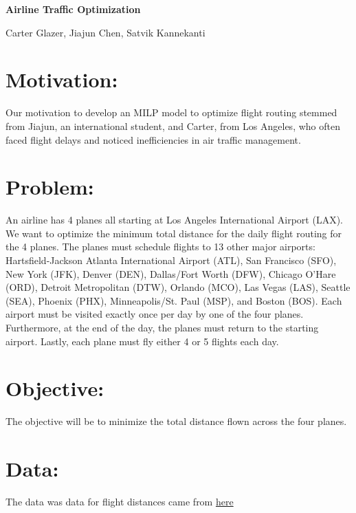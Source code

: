 \documentclass[12pt]{extarticle}
\begin{document}
\begin{center}
\textbf{Airline Traffic Optimization} \\
\begin{center}
Carter Glazer, Jiajun Chen, Satvik Kannekanti
\end{center}
\end{center}

\section*{\small Motivation:}
\hspace{1cm}
Our motivation to develop an MILP model to optimize flight routing stemmed from Jiajun, an international student, and Carter, from Los Angeles, who often faced flight delays and noticed inefficiencies in air traffic management.
\section*{\small Problem:}
\hspace{1cm}
An airline has 4 planes all starting at Los Angeles International Airport (LAX). We want to optimize the minimum total distance for the daily flight routing for the 4 planes. The planes must schedule flights to 13 other major airports: Hartsfield-Jackson Atlanta International Airport (ATL), San Francisco (SFO), New York (JFK), Denver (DEN), Dallas/Fort Worth (DFW), Chicago O'Hare (ORD), Detroit Metropolitan (DTW), Orlando (MCO), Las Vegas (LAS), Seattle (SEA), Phoenix (PHX), Minneapolis/St. Paul (MSP), and Boston (BOS). Each airport must be visited exactly once per day by one of the four planes. Furthermore, at the end of the day, the planes must return to the starting airport. Lastly, each plane must fly either 4 or 5 flights each day.

\section*{\small Objective:}
\hspace{1cm} The objective will be to minimize the total distance flown across the four planes.

\section*{\small Data:}
The data was data for flight distances came from \href{https://www.airmilescalculator.com/
}{here}
\end{document}
